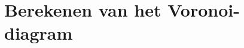 \documentclass[tmi_notities.tex]{subfiles}
\begin{document}
\chapter{Berekenen van het Voronoi-diagram}
\end{document}
